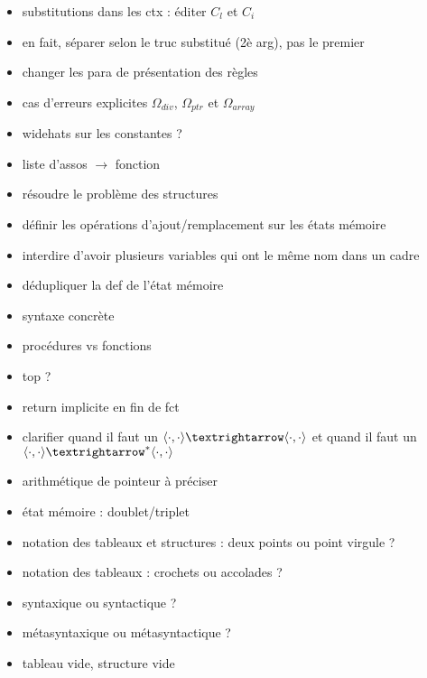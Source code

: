 \begin{itemize}
\item substitutions dans les ctx : éditer $C_l$ et $C_i$
\item en fait, séparer selon le truc substitué (2è arg), pas le premier
\item changer les para de présentation des règles
\item cas d'erreurs explicites $Ω_{div}$, $Ω_{ptr}$ et $Ω_{array}$
\item widehats sur les constantes ?
\item liste d'assos $→$ fonction
\item résoudre le problème des structures
\item définir les opérations d'ajout/remplacement sur les états mémoire
\item interdire d'avoir plusieurs variables qui ont le même nom dans un cadre
\item dédupliquer la def de l'état mémoire
\item syntaxe concrète
\item procédures vs fonctions
\item top ?
\item return implicite en fin de fct
\item clarifier quand il faut un $\mm{\cdot}{\cdot}{\cdot}{\cdot}$ et quand il
faut un $\mmstar{\cdot}{\cdot}{\cdot}{\cdot}$
\item arithmétique de pointeur à préciser
\item état mémoire : doublet/triplet
\item notation des tableaux et structures : deux points ou point virgule ?
\item notation des tableaux : crochets ou accolades ?
\item syntaxique ou syntactique ?
\item métasyntaxique ou métasyntactique ?
\item tableau vide, structure vide
\end{itemize}


